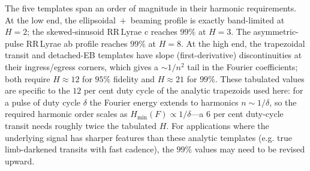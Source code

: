 \documentclass[apj]{emulateapj}
\begin{document}
\begin{table}
\centering
\caption{\label{tab:hvsaccuracy}
The minimum harmonic order $H_{\min}(F)$ at which the $H$-truncated
Fourier expansion of each canonical template captures the listed
fraction $F$ of its total $L^2$ energy.  The right-hand columns
report the empirical period-recovery rate at peak-to-peak SNR$\,=\,7$
on 30 independent synthetic light curves with
$N_{\rm obs}=100$ irregular samples per trial, comparing the Fast
Template Periodogram at $H = H_{\min}(F{=}0.95)$ with the
single-harmonic Lomb--Scargle-equivalent (FTP at $H{=}1$).
Tabulated values come from the analytic Fourier expansions
described in Section~\ref{sec:choiceH} and from the open-source
reproduction script in the paper repository.}

\end{table}

The five templates span an order of magnitude in their harmonic
requirements.  At the low end, the ellipsoidal$\;+\;$beaming profile is
exactly band-limited at $H = 2$; the skewed-sinusoid RR\,Lyrae c
reaches $99\%$ at $H = 3$.  The asymmetric-pulse RR\,Lyrae ab
profile reaches $99\%$ at $H = 8$.  At the high end, the trapezoidal
transit and detached-EB templates have slope (first-derivative)
discontinuities at their ingress/egress corners, which gives a
$\sim 1/n^2$ tail in the Fourier coefficients; both require
$H \approx 12$ for $95\%$ fidelity and $H \approx 21$ for $99\%$.
These tabulated values are specific to the $12$ per cent duty cycle
of the analytic trapezoids used here: for a pulse of duty cycle
$\delta$ the Fourier energy extends to harmonics $n \sim 1/\delta$,
so the required harmonic order scales as
$H_{\min}(F) \propto 1/\delta$---a $6$ per cent duty-cycle transit
needs roughly twice the tabulated $H$.
For applications where the underlying signal has sharper features
than these analytic templates (e.g. true limb-darkened transits with
fast cadence), the $99\%$ values may need to be revised upward.
\end{document}
